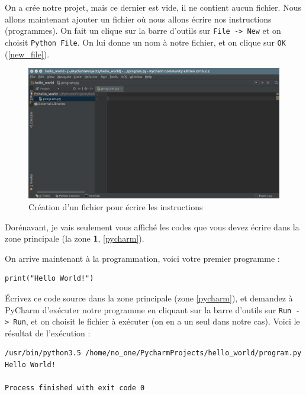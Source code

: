 \documentclass[12pt]{article}
\newcommand{\code}[1]{\colorbox{light-gray}{\texttt{#1}}}
\begin{document}
        On a crée notre projet, mais ce dernier est vide, il ne contient aucun fichier. Nous allons maintenant ajouter
        un fichier où nous allons écrire nos instructions (programmes). On fait un clique sur la barre d'outils sur
        \code{File -> New} et on choisit \code{Python File}. On lui donne un nom à notre fichier, et on clique sur 
        \code{OK} (\autoref{new_file}).

        \begin{figure}[H]
            \centering
            \includegraphics[width=\linewidth]{img/10_new_file.png}
            \caption{Création d'un fichier pour écrire les instructions}
            \label{new_file}
        \end{figure}

        Dorénavant, je vais seulement vous affiché les codes que vous devez écrire dans la zone principale (la zone 
        \textbf{1}, \autoref{pycharm}).

        On arrive maintenant à la programmation, voici votre premier programme :
        \begin{lstlisting}[style=code]
print("Hello World!")
        \end{lstlisting}

        Écrivez ce code source dans la zone principale (zone  \autoref{pycharm}), et demandez à PyCharm 
        d'exécuter notre programme en cliquant sur la barre d'outils sur \code{Run -> Run}, et on choisit le fichier
        à exécuter (on en a un seul dans notre cas). Voici le résultat de l'exécution :

        \begin{lstlisting}[style=exec_result]
/usr/bin/python3.5 /home/no_one/PycharmProjects/hello_world/program.py
Hello World!

Process finished with exit code 0
        \end{lstlisting}
\end{document}
